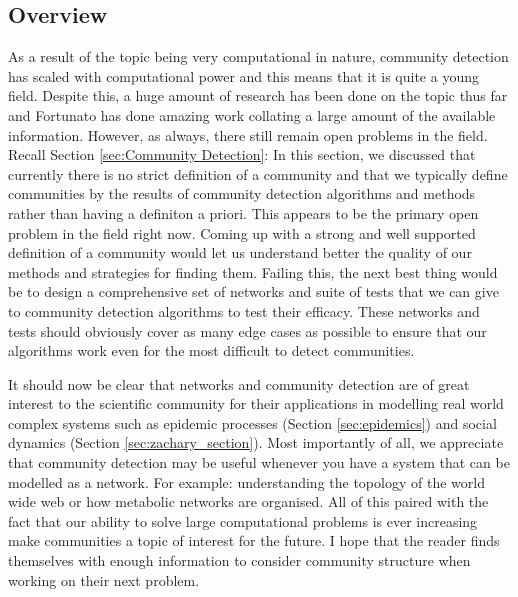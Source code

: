 \subsection{Overview}
As a result of the topic being very computational in nature, community detection has scaled with computational power and this means that it is quite a young field. Despite this, a huge amount of research has been done on the topic thus far and Fortunato has done amazing work collating a large amount of the available information\cite{fortunato}. However, as always, there still remain open problems in the field. Recall Section \ref{sec:Community Detection}: In this section, we discussed that currently there is no strict definition of a community and that we typically define communities by the results of community detection algorithms and methods rather than having a definiton a priori. This appears to be the primary open problem in the field right now. Coming up with a strong and well supported definition of a community would let us understand better the quality of our methods and strategies for finding them. Failing this, the next best thing would be to design a comprehensive set of networks and suite of tests that we can give to community detection algorithms to test their efficacy. These networks and tests should obviously cover as many edge cases as possible to ensure that our algorithms work even for the most difficult to detect communities.

It should now be clear that networks and community detection are of great interest to the scientific community for their applications in modelling real world complex systems such as epidemic processes (Section \ref{sec:epidemics}) and social dynamics (Section \ref{sec:zachary_section}). Most importantly of all, we appreciate that community detection may be useful whenever you have a system that can be modelled as a network. For example: understanding the topology of the world wide web\cite{BARABASI200069} or how metabolic networks are organised\cite{Jeong2000}. All of this paired with the fact that our ability to solve large computational problems is ever increasing make communities a topic of interest for the future. I hope that the reader finds themselves with enough information to consider community structure when working on their next problem.
